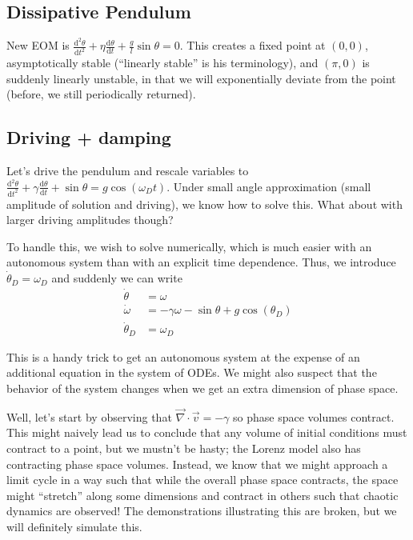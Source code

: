 \documentclass[10pt]{article}
\newcommand{\rd}[2]{\frac{\mathrm{d}#1}{\mathrm{d}#2}}
\newcommand{\rtd}[2]{\frac{\mathrm{d}^2#1}{\mathrm{d}#2^2}}
\begin{document}
\subsection{Dissipative Pendulum}

New EOM is $\rtd{\theta}{t} + \eta \rd{\theta}{t} + \frac{g}{l}\sin\theta = 0$.
This creates a fixed point at $(0,0)$, asymptotically stable (``linearly
stable'' is his terminology), and $(\pi,0)$ is suddenly linearly unstable, in
that we will exponentially deviate from the point (before, we still
periodically returned).

\subsection{Driving + damping}

Let's drive the pendulum and rescale variables to $\rtd{\theta}{t} + \gamma
\rd{\theta}{t} + \sin\theta = g\cos(\omega_D t)$. Under small angle
approximation (small amplitude of solution and driving), we know how to solve
this. What about with larger driving amplitudes though?

To handle this, we wish to solve numerically, which is much easier with an
autonomous system than with an explicit time dependence. Thus, we introduce
$\dot{\theta}_D = \omega_D$ and suddenly we can write
\begin{align}
    \dot{\theta} &= \omega \nonumber\\
    \dot{\omega} &= -\gamma \omega - \sin\theta + g\cos(\theta_D) \nonumber\\
    \dot{\theta}_D &= \omega_D
\end{align}

This is a handy trick to get an autonomous system at the expense of an
additional equation in the system of ODEs. We might also suspect that the
behavior of the system changes when we get an extra dimension of phase space.

Well, let's start by observing that $\vec{\nabla} \cdot \vec{v} = -\gamma$ so
phase space volumes contract. This might naively lead us to conclude that any
volume of initial conditions must contract to a point, but we mustn't be hasty;
the Lorenz model also has contracting phase space volumes. Instead, we know
that we might approach a limit cycle in a way such that while the overall phase
space contracts, the space might ``stretch'' along some dimensions and contract
in others such that chaotic dynamics are observed! The demonstrations
illustrating this are broken, but we will definitely simulate this.
\end{document}
